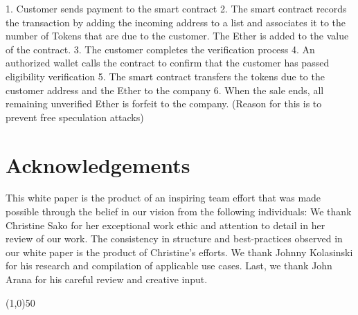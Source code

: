\documentclass{article}
\begin{document}
1. Customer sends payment to the smart contract
2. The smart contract records the transaction by adding the incoming address to a list and associates it to the number of Tokens that are due to the customer.  The Ether is added to the value of the contract.
3. The customer completes the verification process
4. An authorized wallet calls the contract to confirm that the customer has passed eligibility verification
5. The smart contract transfers the tokens due to the customer address and the Ether to the company
6. When the sale ends, all remaining unverified Ether is forfeit to the company. (Reason for this is to prevent free speculation attacks)

\clearpage


\section {Acknowledgements}
This white paper is the product of an inspiring team effort that was made possible through the belief in our vision from the following individuals: We thank Christine Sako for her exceptional work ethic and attention to detail in her review of our work. The consistency in structure and best-practices observed in our white paper is the product of Christine's efforts. We thank Johnny Kolasinski for his research and compilation of applicable use cases. Last, we thank John Arana for his careful review and creative input.

\begin{center}
\line(1,0){50}
\end{center}

\begin{thebibliography}{9}

\end{thebibliography}

\clearpage

\printglossaries

\end{document}

